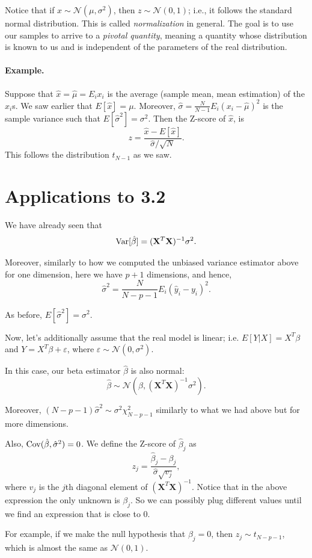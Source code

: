 \documentclass[11pt]{article}
\theoremstyle{definition}
\newcommand{\XX}{\mathbf{X}}
\newcommand{\Normal}[2]{\ensuremath{\mathcal N (#1, #2)}}
\begin{document}
Notice that if $x\sim\Normal{\mu}{\sigma^2}$, then $z\sim\Normal 0 1$; i.e., it
follows the standard normal distribution. This is called \emph{normalization} in
general. The goal is to use our samples to arrive to a \emph{pivotal quantity},
meaning a quantity whose distribution is known to us and is independent of the
parameters of the real distribution.

\paragraph{Example.} Suppose that $\hat x=\hat\mu=E_i x_i$ is the average (sample mean,
mean estimation) of the $x_i$s. We saw earlier that $E[\hat{x}]=\mu$. Moreover,
$\hat\sigma=\frac{N}{N-1}E_i(x_i-\hat\mu)^2$ is the sample variance such that
$E[\hat\sigma^2]=\sigma^2$. Then the Z-score of $\hat x$, is
\[z=\frac{\hat x-E[\hat x]}{\hat\sigma/\sqrt{N}}.\]
This follows the distribution $t_{N-1}$ as we saw.

\section{Applications to 3.2}
We have already seen that
\[\Var[\hat\beta]=(\XX^T\XX)^{-1}\sigma^2.\]

Moreover, similarly to how we computed the unbiased variance estimator above for
one dimension, here we have $p+1$ dimensions, and hence,
\[\hat\sigma^2=\frac{N}{N-p-1}E_i(\hat y_i-y_i)^2.\]

As before, $E[\hat\sigma^2]=\sigma^2$.

Now, let's additionally assume that the real model is linear; i.e.
$E[Y|X]=X^T\beta$ and $Y=X^T\beta+\varepsilon$, where
$\varepsilon\sim\Normal{0}{\sigma^2}$.

In this case, our beta estimator $\hat\beta$ is also normal:
\[\hat\beta\sim\Normal{\beta}{(\XX^T\XX)^{-1}\sigma^2}.\]

Moreover, $(N-p-1)\hat\sigma^2\sim\sigma^2\chi^2_{N-p-1}$ similarly to what we
had above but for more dimensions.

Also, $\operatorname*{Cov}(\hat\beta,\hat\sigma^2)=0$. We define the Z-score of $\hat\beta_j$
as
\[z_j=\frac{\hat\beta_j-\beta_j}{\hat\sigma\sqrt{v_j}},\] where $v_j$ is the
$j$th diagonal element of $(\XX^T\XX)^{-1}$. Notice that in the above expression
the only unknown is $\beta_j$. So we can possibly plug different values until we
find an expression that is close to 0.

For example, if we make the null hypothesis that $\beta_j=0$, then $z_j\sim
	t_{N-p-1}$, which is almost the same as $\Normal 0 1$.
\end{document}
